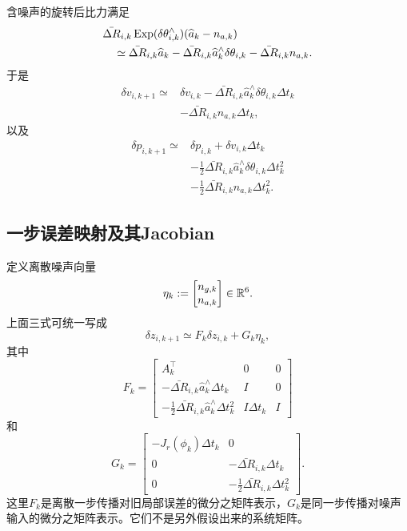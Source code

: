 含噪声的旋转后比力满足
\[
\begin{aligned}
    &\bar{\Delta R}_{i,k}
      \operatorname{Exp}(\delta\theta_{i,k}^\wedge)
      (\widehat a_k-n_{a,k})\\
    &\quad\simeq
    \bar{\Delta R}_{i,k}\widehat a_k
    -\bar{\Delta R}_{i,k}\widehat a_k^\wedge
     \delta\theta_{i,k}
    -\bar{\Delta R}_{i,k}n_{a,k}.
\end{aligned}
\]
于是
\[
\boxed{
\begin{aligned}
    \delta v_{i,k+1}
    \simeq{}&\delta v_{i,k}
    -\bar{\Delta R}_{i,k}\widehat a_k^\wedge
     \delta\theta_{i,k}\Delta t_k\\
    &-\bar{\Delta R}_{i,k}n_{a,k}\Delta t_k,
\end{aligned}
}
\]
以及
\[
\boxed{
\begin{aligned}
    \delta p_{i,k+1}
    \simeq{}&\delta p_{i,k}
    +\delta v_{i,k}\Delta t_k\\
    &-\frac12\bar{\Delta R}_{i,k}\widehat a_k^\wedge
     \delta\theta_{i,k}\Delta t_k^2\\
    &-\frac12\bar{\Delta R}_{i,k}n_{a,k}\Delta t_k^2.
\end{aligned}
}
\]

\subsection{一步误差映射及其Jacobian}

定义离散噪声向量
\[
    \eta_k
    :=
    \begin{bmatrix}
        n_{g,k}\\
        n_{a,k}
    \end{bmatrix}
    \in\mathbb{R}^6.
\]
上面三式可统一写成
\[
    \delta z_{i,k+1}
    \simeq
    F_k\delta z_{i,k}+G_k\eta_k,
\]
其中
\[
\boxed{
F_k=
\begin{bmatrix}
    A_k^\top & 0 & 0\\
    -\bar{\Delta R}_{i,k}\widehat a_k^\wedge\Delta t_k
        & I & 0\\
    -\frac12\bar{\Delta R}_{i,k}\widehat a_k^\wedge\Delta t_k^2
        & I\Delta t_k & I
\end{bmatrix}
}
\]
和
\[
\boxed{
G_k=
\begin{bmatrix}
    -J_r(\phi_k)\Delta t_k & 0\\
    0 & -\bar{\Delta R}_{i,k}\Delta t_k\\
    0 & -\frac12\bar{\Delta R}_{i,k}\Delta t_k^2
\end{bmatrix}.
}
\]
这里$F_k$是离散一步传播对旧局部误差的微分之矩阵表示，$G_k$是同一步传播对噪声输入的微分之矩阵表示。它们不是另外假设出来的系统矩阵。

